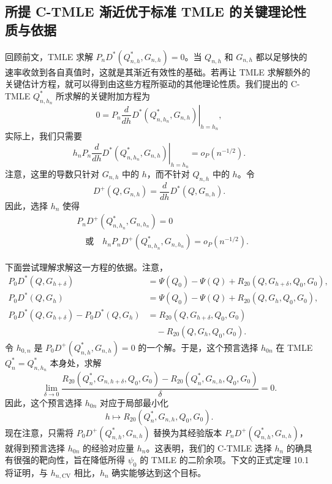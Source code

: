 \subsection{所提 C-TMLE 渐近优于标准 TMLE 的关键理论性质与依据}
\label{subsec:ch10-critical-equation-rationale}

回顾前文，TMLE 求解 $P_nD^*(Q_{n,h}^*,G_{n,h})=0$。当 $Q_{n,h}$ 和 $G_{n,h}$ 都以足够快的速率收敛到各自真值时，这就是其渐近有效性的基础。若再让 TMLE 求解额外的关键估计方程，就可以得到由这些方程所驱动的其他理论性质。我们提出的 C-TMLE $Q_{n,h_n}^*$ 所求解的关键附加方程为
\begin{equation}
 0=\left.P_n\frac{d}{dh}D^*(Q_{n,h_n}^*,G_{n,h})\right|_{h=h_n},
 \tag{10.3}
\end{equation}
实际上，我们只需要
\begin{equation}
 \left.h_nP_n\frac{d}{dh}D^*(Q_{n,h_n}^*,G_{n,h})\right|_{h=h_n}
 =o_P(n^{-1/2}).
 \tag{10.4}
\end{equation}
注意，这里的导数只针对 $G_{n,h}$ 中的 $h$，而不针对 $Q_{n,h}$ 中的 $h$。令
\[
 D^+(Q,G_{n,h})=\frac{d}{dh}D^*(Q,G_{n,h}).
\]
因此，选择 $h_n$ 使得
\begin{equation}
 \begin{aligned}
 &P_nD^+(Q_{n,h_n}^*,G_{n,h_n})=0\\
 &\quad\text{或}\quad
 h_nP_nD^+(Q_{n,h_n}^*,G_{n,h_n})=o_P(n^{-1/2}).
 \end{aligned}
 \tag{10.5}
\end{equation}

下面尝试理解求解这一方程的依据。注意，
\[
 \begin{aligned}
 P_0D^*(Q,G_{h+\delta})
  &=\Psi(Q_0)-\Psi(Q)+R_{20}(Q,G_{h+\delta},Q_0,G_0),\\
 P_0D^*(Q,G_h)
  &=\Psi(Q_0)-\Psi(Q)+R_{20}(Q,G_h,Q_0,G_0),\\
 P_0D^*(Q,G_{h+\delta})-P_0D^*(Q,G_h)
  &=R_{20}(Q,G_{h+\delta},Q_0,G_0)\\
  &\quad{}-R_{20}(Q,G_h,Q_0,G_0).
 \end{aligned}
\]
令 $h_{0,n}$ 是 $P_0D^+(Q_{n,h}^*,G_{n,h})=0$ 的一个解。于是，这个预言选择 $h_{0n}$ 在 TMLE $Q_n^*=Q_{n,h_n}^*$ 本身处，求解
\[
 \lim_{\delta\to0}
 \frac{R_{20}(Q_n^*,G_{n,h+\delta},Q_0,G_0)
       -R_{20}(Q_n^*,G_{n,h},Q_0,G_0)}{\delta}=0.
\]
因此，这个预言选择 $h_{0n}$ 对应于局部最小化
\[
 h\mapsto R_{20}(Q_n^*,G_{n,h},Q_0,G_0).
\]
现在注意，只需将 $P_0D^+(Q_{n,h}^*,G_{n,h})$ 替换为其经验版本 $P_nD^+(Q_{n,h}^*,G_{n,h})$，就得到预言选择 $h_{0n}$ 的经验对应量 $h_n$。这表明，我们的 C-TMLE 选择 $h_n$ 的确具有很强的靶向性，旨在降低所得 $\psi_0$ 的 TMLE 的二阶余项。下文的正式定理 10.1 将证明，与 $h_{n,\mathrm{CV}}$ 相比，$h_n$ 确实能够达到这个目标。

